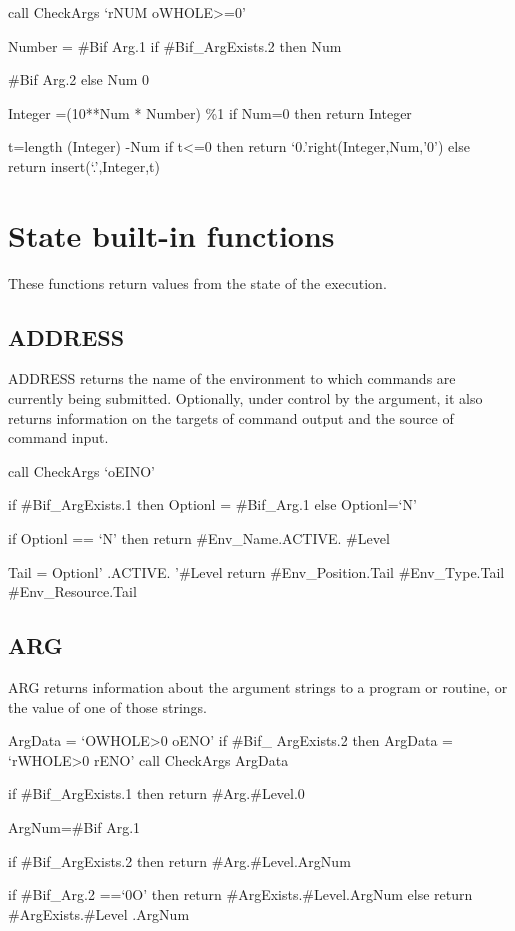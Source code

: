 call CheckArgs `rNUM oWHOLE\textgreater=0'

Number = \#Bif Arg.1 if \#Bif\_ArgExists.2 then Num

\#Bif Arg.2 else Num 0

Integer =(10**Num * Number) \%1 if Num=0 then return Integer

t=length (Integer) -Num if t\textless=0 then return
`0.'right(Integer,Num,'0') else return insert(`.',Integer,t)

\section{State built-in functions}\label{state-built-in-functions}

These functions return values from the state of the execution.

\subsection{ADDRESS}\label{address}

ADDRESS returns the name of the environment to which commands are
currently being submitted. Optionally, under control by the argument, it
also returns information on the targets of command output and the source
of command input.

call CheckArgs `oEINO'

if \#Bif\_ArgExists.1 then Optionl = \#Bif\_Arg.1 else Optionl=`N'

if Optionl == `N' then return \#Env\_Name.ACTIVE. \#Level

Tail = Optionl' .ACTIVE. '\#Level return \#Env\_Position.Tail
\#Env\_Type.Tail \#Env\_Resource.Tail

\subsection{ARG}\label{arg}

ARG returns information about the argument strings to a program or
routine, or the value of one of those strings.

ArgData = `OWHOLE\textgreater0 oENO' if \#Bif\_ ArgExists.2 then ArgData
= `rWHOLE\textgreater0 rENO' call CheckArgs ArgData

if \#Bif\_ArgExists.1 then return \#Arg.\#Level.0

ArgNum=\#Bif Arg.1

if \#Bif\_ArgExists.2 then return \#Arg.\#Level.ArgNum

if \#Bif\_Arg.2 ==`0O' then return \#ArgExists.\#Level.ArgNum else
return \#ArgExists.\#Level .ArgNum

